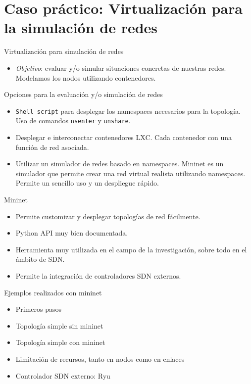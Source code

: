 \documentclass[aspectratio=169,xcolor=dvipsnames]{beamer}
\begin{document}
	
	\section{Caso práctico: Virtualización para la simulación de redes}
	
	\begin{frame}{Virtualización para simulación de redes}
		\begin{itemize}
		    \item \textit{Objetivo}: evaluar y/o simular situaciones concretas de nuestras redes. Modelamos los nodos utilizando contenedores.
		\end{itemize}
		
		\begin{block}{Opciones para la evaluación y/o simulación de redes}
		    \begin{itemize}
		        \item \texttt{Shell script} para desplegar los namespaces necesarios para la topología. Uso de comandos \texttt{nsenter} y \texttt{unshare}.
		        
		        \item Desplegar e interconectar contenedores LXC. Cada contenedor con una función de red asociada.
		        
		        \item Utilizar un simulador de redes basado en namespaces. Mininet es un simulador que permite crear una red virtual realista utilizando namespaces. Permite un sencillo uso y un despliegue rápido.
		    \end{itemize}
		\end{block}
	\end{frame}
	
	\begin{frame}{Mininet}
	    \begin{itemize}
	        \item Permite customizar y desplegar topologías de red fácilmente.
	        \item Python API muy bien documentada.
	        \item Herramienta muy utilizada en el campo de la investigación, sobre todo en el ámbito de SDN.
	        \item Permite la integración de controladores SDN externos.
	    \end{itemize}
	
	    \begin{alertblock}{Ejemplos realizados con mininet}
	        \begin{itemize}
	            \item Primeros pasos
	            \item Topología simple sin mininet
	            \item Topología simple con mininet
	            \item Limitación de recursos, tanto en nodos como en enlaces
	            \item Controlador SDN externo: Ryu
	        \end{itemize}
	    \end{alertblock}
	\end{frame}
	
\end{document}
